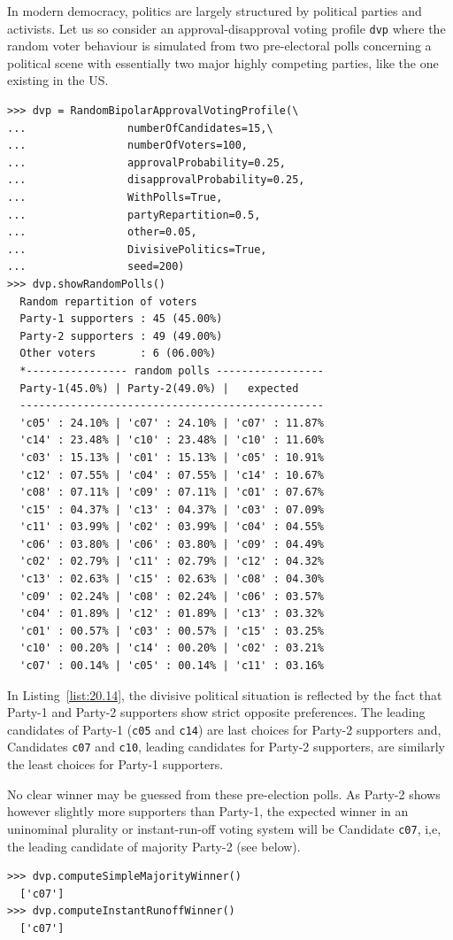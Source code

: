 In modern democracy, politics  are largely structured by political parties and activists. Let us so consider an approval-disapproval voting profile \texttt{dvp} where the random voter behaviour is simulated from two pre-electoral polls concerning a political scene with essentially two major highly competing parties, like the one existing in the US.
\begin{lstlisting}[caption={A random approval-disapproval voting profile in a divisive political context},label=list:20.14]
>>> dvp = RandomBipolarApprovalVotingProfile(\
...                numberOfCandidates=15,\
...                numberOfVoters=100,
...                approvalProbability=0.25,
...                disapprovalProbability=0.25,
...                WithPolls=True,
...                partyRepartition=0.5,
...                other=0.05,
...                DivisivePolitics=True,
...                seed=200)
>>> dvp.showRandomPolls()
  Random repartition of voters
  Party-1 supporters : 45 (45.00%)
  Party-2 supporters : 49 (49.00%)
  Other voters       : 6 (06.00%)
  *---------------- random polls -----------------
  Party-1(45.0%) | Party-2(49.0%) |   expected  
  ------------------------------------------------
  'c05' : 24.10% | 'c07' : 24.10% | 'c07' : 11.87%
  'c14' : 23.48% | 'c10' : 23.48% | 'c10' : 11.60%
  'c03' : 15.13% | 'c01' : 15.13% | 'c05' : 10.91%
  'c12' : 07.55% | 'c04' : 07.55% | 'c14' : 10.67%
  'c08' : 07.11% | 'c09' : 07.11% | 'c01' : 07.67%
  'c15' : 04.37% | 'c13' : 04.37% | 'c03' : 07.09%
  'c11' : 03.99% | 'c02' : 03.99% | 'c04' : 04.55%
  'c06' : 03.80% | 'c06' : 03.80% | 'c09' : 04.49%
  'c02' : 02.79% | 'c11' : 02.79% | 'c12' : 04.32%
  'c13' : 02.63% | 'c15' : 02.63% | 'c08' : 04.30%
  'c09' : 02.24% | 'c08' : 02.24% | 'c06' : 03.57%
  'c04' : 01.89% | 'c12' : 01.89% | 'c13' : 03.32%
  'c01' : 00.57% | 'c03' : 00.57% | 'c15' : 03.25%
  'c10' : 00.20% | 'c14' : 00.20% | 'c02' : 03.21%
  'c07' : 00.14% | 'c05' : 00.14% | 'c11' : 03.16%
\end{lstlisting}   

In Listing~\vref{list:20.14}, the divisive political situation is reflected by the fact that Party-1 and Party-2 supporters show strict opposite preferences. The leading candidates of Party-1 (\texttt{c05} and \texttt{c14}) are last choices for Party-2 supporters and, Candidates \texttt{c07} and \texttt{c10}, leading candidates for Party-2 supporters, are similarly the least choices for Party-1 supporters.

No clear winner may be guessed from these pre-election polls. As Party-2 shows however slightly more supporters than Party-1, the expected winner in an uninominal plurality or instant-run-off voting system will be Candidate \texttt{c07}, i,e, the leading candidate of majority Party-2 (see below).
\begin{lstlisting}
>>> dvp.computeSimpleMajorityWinner()
  ['c07']
>>> dvp.computeInstantRunoffWinner()
  ['c07']
\end{lstlisting}

